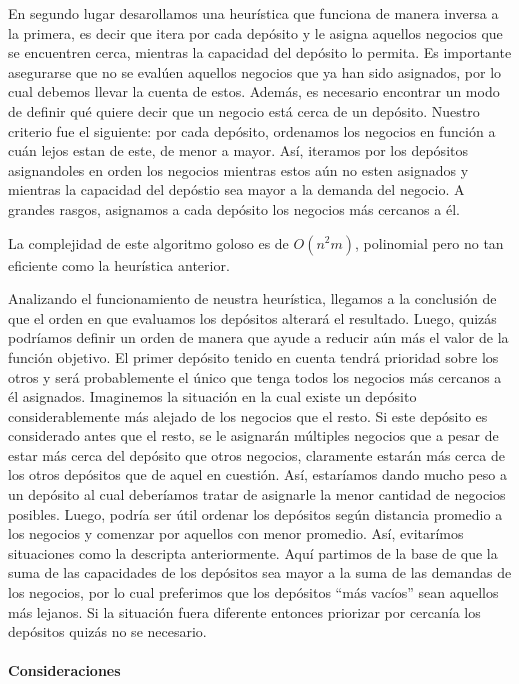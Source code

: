 \documentclass[
]{article}
\begin{document}
En segundo lugar desarollamos una heurística que funciona de manera
inversa a la primera, es decir que itera por cada depósito y le asigna
aquellos negocios que se encuentren cerca, mientras la capacidad del
depósito lo permita. Es importante asegurarse que no se evalúen aquellos
negocios que ya han sido asignados, por lo cual debemos llevar la cuenta
de estos. Además, es necesario encontrar un modo de definir qué quiere
decir que un negocio está cerca de un depósito. Nuestro criterio fue el
siguiente: por cada depósito, ordenamos los negocios en función a cuán
lejos estan de este, de menor a mayor. Así, iteramos por los depósitos
asignandoles en orden los negocios mientras estos aún no esten asignados
y mientras la capacidad del depóstio sea mayor a la demanda del negocio.
A grandes rasgos, asignamos a cada depósito los negocios más cercanos a
él.

La complejidad de este algoritmo goloso es de \(O(n^2m)\), polinomial
pero no tan eficiente como la heurística anterior.

Analizando el funcionamiento de neustra heurística, llegamos a la
conclusión de que el orden en que evaluamos los depósitos alterará el
resultado. Luego, quizás podríamos definir un orden de manera que ayude
a reducir aún más el valor de la función objetivo. El primer depósito
tenido en cuenta tendrá prioridad sobre los otros y será probablemente
el único que tenga todos los negocios más cercanos a él asignados.
Imaginemos la situación en la cual existe un depósito considerablemente
más alejado de los negocios que el resto. Si este depósito es
considerado antes que el resto, se le asignarán múltiples negocios que a
pesar de estar más cerca del depósito que otros negocios, claramente
estarán más cerca de los otros depósitos que de aquel en cuestión. Así,
estaríamos dando mucho peso a un depósito al cual deberíamos tratar de
asignarle la menor cantidad de negocios posibles. Luego, podría ser útil
ordenar los depósitos según distancia promedio a los negocios y comenzar
por aquellos con menor promedio. Así, evitarímos situaciones como la
descripta anteriormente. Aquí partimos de la base de que la suma de las
capacidades de los depósitos sea mayor a la suma de las demandas de los
negocios, por lo cual preferimos que los depósitos ``más vacíos'' sean
aquellos más lejanos. Si la situación fuera diferente entonces priorizar
por cercanía los depósitos quizás no se necesario.

\hypertarget{consideraciones}{%
\paragraph{Consideraciones}\label{consideraciones}}
\end{document}
